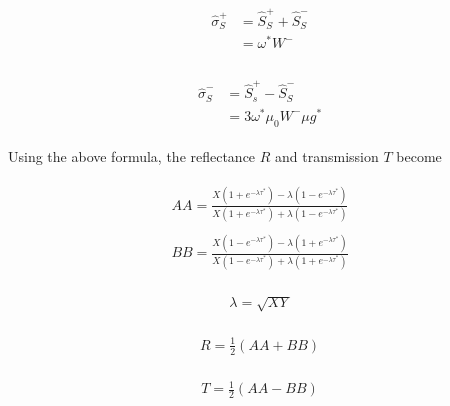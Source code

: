 \begin{eqnarray}
\begin{aligned}
\hat{\sigma}_{S}^{+} &=\hat{S}_{S}^{+}+\hat{S}_{S}^{-} \\
&=\omega^{*} W^{-} \\
\end{aligned}
\end{eqnarray}

\begin{eqnarray}
\begin{aligned}
\hat{\sigma}_{S}^{-} &=\hat{S}_{s}^{+}-\hat{S}_{S}^{-} \\
&=3 \omega^{*} \mu_{0} W^{-} \mu g^{*}
\end{aligned}
\end{eqnarray}

Using the above formula, the reflectance \(R\) and transmission \(T\)
become

\begin{eqnarray}
\begin{array}{c}
A A=\frac{X\left(1+e^{-\lambda \tau^{*}}\right)-\lambda\left(1-e^{-\lambda \tau^{*}}\right)}{X\left(1+e^{-\lambda \tau^{*}}\right)+\lambda\left(1-e^{-\lambda \tau^{*}}\right)}
\end{array}
\end{eqnarray} \begin{eqnarray}
\begin{array}{c}
B B=\frac{X\left(1-e^{-\lambda \tau^{*}}\right)-\lambda\left(1+e^{-\lambda \tau^{*}}\right)}{X\left(1-e^{-\lambda \tau^{*}}\right)+\lambda\left(1+e^{-\lambda \tau^{*}}\right)}
\end{array}
\end{eqnarray}

\begin{eqnarray}
\begin{array}{c}
\lambda=\sqrt{X Y}
\end{array}
\end{eqnarray}

\begin{eqnarray}
\begin{array}{c}
R=\frac{1}{2}(A A+B B)
\end{array}
\end{eqnarray}

\begin{eqnarray}
\begin{array}{c}
T=\frac{1}{2}(A A-B B)
\end{array}
\end{eqnarray}

